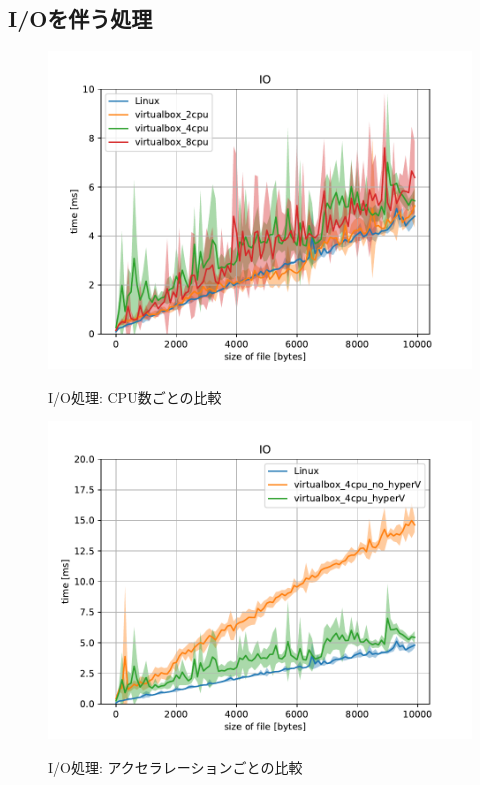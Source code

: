 \documentclass[onecolumn]{preport}
\begin{document}
\subsection{I/Oを伴う処理}
\begin{figure}[H]
  \begin{center}
    \begin{minipage}{0.49\columnwidth}
      \includegraphics[width=\columnwidth]{io_cpu.pdf}
      \caption{I/O処理: CPU数ごとの比較}
      \label{figure:io_cpu}
    \end{minipage}
    \begin{minipage}{0.49\columnwidth}
      \includegraphics[width=\columnwidth]{io_acc.pdf}
      \caption{I/O処理: アクセラレーションごとの比較}
      \label{figure:io_acc}
    \end{minipage}
    \label{figure:io}
  \end{center}
\end{figure}
\end{document}
